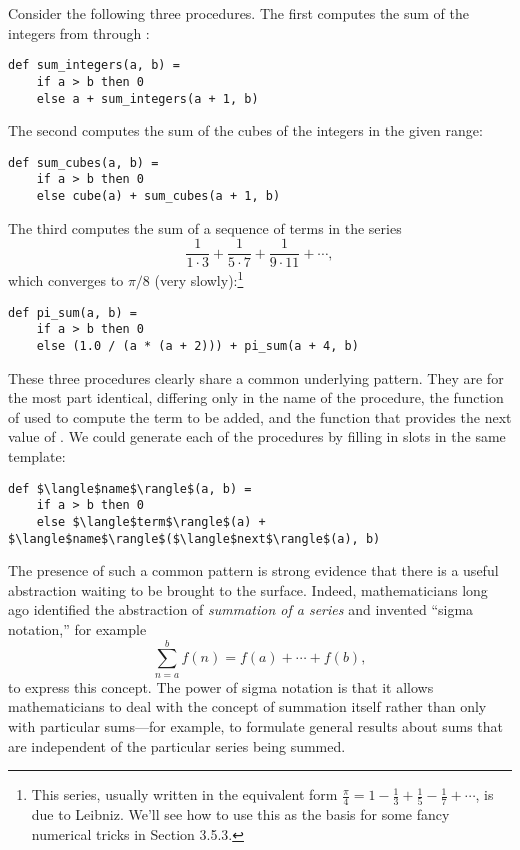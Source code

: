 Consider the following three procedures. The first computes the sum of the integers from  through :

\begin{lstlisting}[style=slate]
def sum_integers(a, b) =
    if a > b then 0
    else a + sum_integers(a + 1, b)
\end{lstlisting}

The second computes the sum of the cubes of the integers in the given range:

\begin{lstlisting}[style=slate]
def sum_cubes(a, b) =
    if a > b then 0
    else cube(a) + sum_cubes(a + 1, b)
\end{lstlisting}

The third computes the sum of a sequence of terms in the series
\[
\frac{1}{1 \cdot 3} + \frac{1}{5 \cdot 7} + \frac{1}{9 \cdot 11} + \cdots,
\]
which converges to $\pi/8$ (very slowly):\footnote{This series, usually written in the equivalent form $\frac{\pi}{4} = 1 - \frac{1}{3} + \frac{1}{5} - \frac{1}{7} + \cdots$, is due to Leibniz. We'll see how to use this as the basis for some fancy numerical tricks in Section 3.5.3.}

\begin{lstlisting}[style=slate]
def pi_sum(a, b) =
    if a > b then 0
    else (1.0 / (a * (a + 2))) + pi_sum(a + 4, b)
\end{lstlisting}

These three procedures clearly share a common underlying pattern. They are for the most part identical, differing only in the name of the procedure, the function of  used to compute the term to be added, and the function that provides the next value of . We could generate each of the procedures by filling in slots in the same template:

\begin{lstlisting}[style=plain]
def $\langle$name$\rangle$(a, b) =
    if a > b then 0
    else $\langle$term$\rangle$(a) + $\langle$name$\rangle$($\langle$next$\rangle$(a), b)
\end{lstlisting}

The presence of such a common pattern is strong evidence that there is a useful abstraction waiting to be brought to the surface. Indeed, mathematicians long ago identified the abstraction of \emph{summation of a series} and invented ``sigma notation,'' for example
\[
\sum_{n=a}^{b} f(n) = f(a) + \cdots + f(b),
\]
to express this concept. The power of sigma notation is that it allows mathematicians to deal with the concept of summation itself rather than only with particular sums---for example, to formulate general results about sums that are independent of the particular series being summed.

